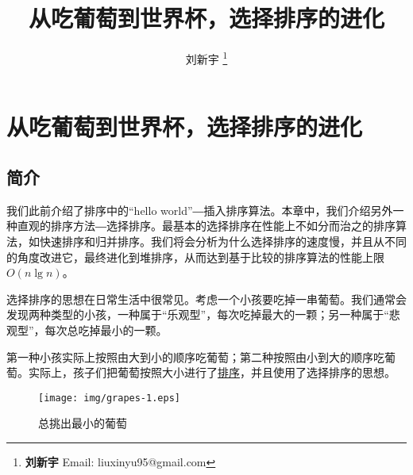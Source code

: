 \documentclass{ctexart}
\begin{document}


\title{从吃葡萄到世界杯，选择排序的进化}

\author{刘新宇
\thanks{{\bfseries 刘新宇 } \newline
  Email: liuxinyu95@gmail.com \newline}
  }

\maketitle
\fi


\ifx\wholebook\relax
\chapter{从吃葡萄到世界杯，选择排序的进化}
\fi

\def\includetikz{}

\section{简介}
\label{introduction} 

我们此前介绍了排序中的“hello world”―插入排序算法。本章中，我们介绍另外一种直观的排序方法―选择排序。最基本的选择排序在性能上不如分而治之的排序算法，如快速排序和归并排序。我们将会分析为什么选择排序的速度慢，并且从不同的角度改进它，最终进化到堆排序，从而达到基于比较的排序算法的性能上限$O(n \lg n)$。

选择排序的思想在日常生活中很常见。考虑一个小孩要吃掉一串葡萄。我们通常会发现两种类型的小孩，一种属于“乐观型”，每次吃掉最大的一颗；另一种属于“悲观型”，每次总吃掉最小的一颗。

第一种小孩实际上按照由大到小的顺序吃葡萄；第二种按照由小到大的顺序吃葡萄。实际上，孩子们把葡萄按照大小进行了\underline{排序}，并且使用了选择排序的思想。
\begin{figure}[htbp]
  \centering
  \texttt{[image: img/grapes-1.eps]}
  \caption{总挑出最小的葡萄}
  \label{fig:eat-grapes}
\end{figure}
\end{document}
